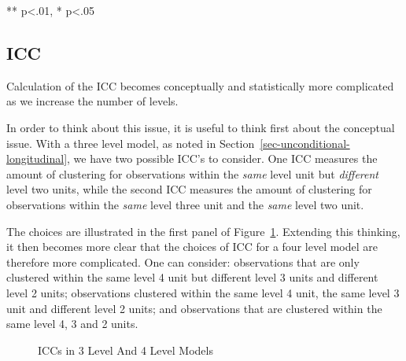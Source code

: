 \documentclass[
  letterpaper,
  DIV=11,
  numbers=noendperiod]{scrreprt}
\begin{document}
** p\textless.01, * p\textless.05

\subsection{ICC}\label{icc}

Calculation of the ICC becomes conceptually and statistically more
complicated as we increase the number of levels. 

In order to think about this issue, it is useful to think first about
the conceptual issue. With a three level model, as noted in
Section~\ref{sec-unconditional-longitudinal}, we have two possible ICC's
to consider. One ICC measures the amount of clustering for observations
within the \emph{same} level unit but \emph{different} level two units,
while the second ICC measures the amount of clustering for observations
within the \emph{same} level three unit and the \emph{same} level two
unit.

The choices are illustrated in the first panel of Figure~\ref{fig-ICC}.
Extending this thinking, it then becomes more clear that the choices of
ICC for a four level model are therefore more complicated. One can
consider: observations that are only clustered within the same level 4
unit but different level 3 units and different level 2 units;
observations clustered within the same level 4 unit, the same level 3
unit and different level 2 units; and observations that are clustered
within the same level 4, 3 and 2 units.

\begin{figure}


\caption{\label{fig-ICC}ICCs in 3 Level And 4 Level Models}

\end{figure}%
\end{document}
